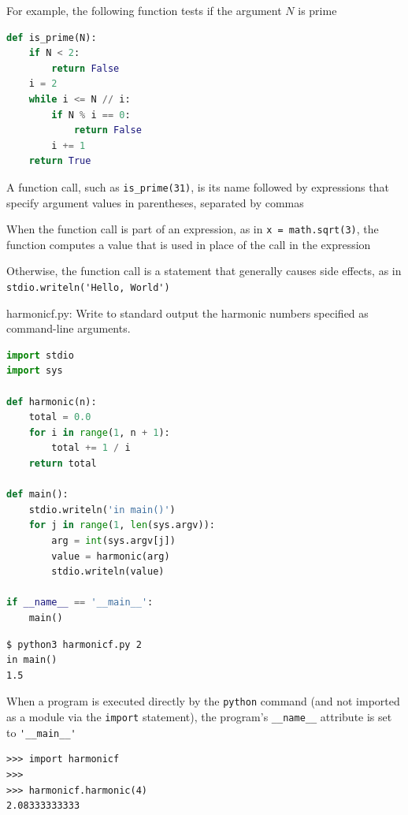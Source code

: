 \documentclass[8pt,a4paper,compress]{beamer}
\begin{document}
\begin{frame}[fragile]
\pause

For example, the following function tests if the argument $N$ is prime

\begin{lstlisting}[language=Python]
def is_prime(N):
    if N < 2: 
        return False
    i = 2
    while i <= N // i:
        if N % i == 0:
            return False
        i += 1
    return True
\end{lstlisting}

\pause
\bigskip

A function call, such as \lstinline{is_prime(31)}, is its name followed by expressions that specify argument values in parentheses, separated by commas

\pause
\bigskip

When the function call is part of an expression, as in \lstinline{x = math.sqrt(3)}, the function computes a value that is used in place of the call in the expression

\pause
\bigskip

Otherwise, the function call is a statement that generally causes side effects, as in \lstinline{stdio.writeln('Hello, World')}
\end{frame}

\begin{frame}[fragile]
\pause

\begin{framed}
\tiny harmonicf.py:  Write to standard output the harmonic numbers specified as command-line arguments.
\end{framed}

\begin{lstlisting}[language=Python]
import stdio
import sys

def harmonic(n):
    total = 0.0
    for i in range(1, n + 1):
        total += 1 / i
    return total

def main():
    stdio.writeln('in main()')
    for j in range(1, len(sys.argv)):
        arg = int(sys.argv[j])
        value = harmonic(arg)
        stdio.writeln(value)

if __name__ == '__main__':
    main()
\end{lstlisting}

\pause

\begin{lstlisting}[language={}]
$ python3 harmonicf.py 2
in main()
1.5
\end{lstlisting}

\pause
\bigskip

When a program is executed directly by the \lstinline{python} command (and not imported as a module via the \lstinline{import} statement), the program's \lstinline{__name__} attribute is set to \lstinline{'__main__'}

\begin{lstlisting}[language={}]
>>> import harmonicf
>>> 
>>> harmonicf.harmonic(4)
2.08333333333
\end{lstlisting}
\end{frame}
\end{document}
